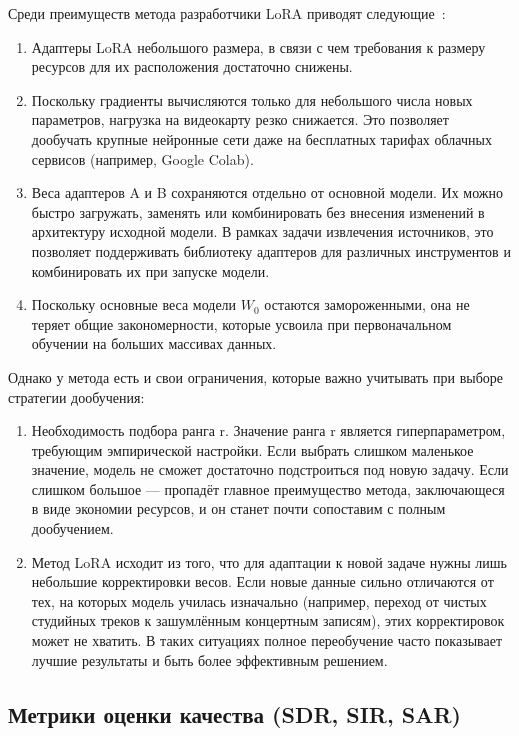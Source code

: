 \documentclass[14pt]{extarticle}
\begin{document}
Среди преимуществ метода разработчики LoRA приводят следующие~\cite{LoRA}:
\begin{enumerate}[label=\arabic*)]
	\item Адаптеры LoRA небольшого размера, в связи с чем требования к размеру ресурсов для их расположения достаточно снижены.
	\item Поскольку градиенты вычисляются только для небольшого числа новых параметров, нагрузка на видеокарту резко снижается. 
	Это позволяет дообучать крупные нейронные сети даже на бесплатных тарифах облачных сервисов (например, Google Colab).
	\item Веса адаптеров A и B сохраняются отдельно от основной модели. Их можно быстро загружать, заменять или комбинировать без внесения изменений в архитектуру исходной модели.
	В рамках задачи извлечения источников, это позволяет поддерживать библиотеку адаптеров для различных инструментов 
	и комбинировать их при запуске модели.
	\item Поскольку основные веса модели $W_0$ остаются замороженными, она не теряет общие закономерности, которые усвоила при первоначальном 
	обучении на больших массивах данных.
\end{enumerate}

Однако у метода есть и свои ограничения, которые важно учитывать при выборе стратегии дообучения:
\begin{enumerate}[label=\arabic*)]
	\item Необходимость подбора ранга r. Значение ранга r является гиперпараметром, требующим эмпирической настройки.
	Если выбрать слишком маленькое значение, модель не сможет достаточно подстроиться под новую задачу. 
	Если слишком большое --- пропадёт главное преимущество метода, заключающеся в виде экономии ресурсов, и он станет почти сопоставим с полным дообучением.
	\item Метод LoRA исходит из того, что для адаптации к новой задаче нужны лишь небольшие корректировки весов. 
	Если новые данные сильно отличаются от тех, на которых модель училась изначально (например, переход от чистых студийных треков к 
	зашумлённым концертным записям), этих корректировок может не хватить. 
	В таких ситуациях полное переобучение часто показывает лучшие результаты и быть более эффективным решением.
\end{enumerate}


\subsection{Метрики оценки качества (SDR, SIR, SAR)}
\end{document}
